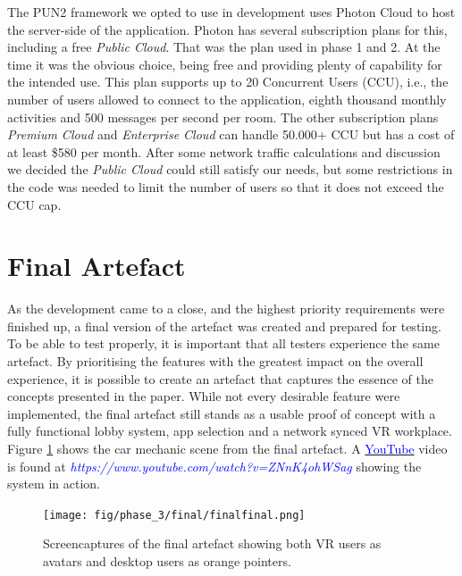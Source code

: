 The PUN2 framework we opted to use in development uses Photon Cloud to host the server-side of the application. Photon has several subscription plans for this, including a free \textit{Public Cloud}. That was the plan used in phase 1 and 2. At the time it was the obvious choice, being free and providing plenty of capability for the intended use. This plan supports up to 20 Concurrent Users (CCU), i.e., the number of users allowed to connect to the application, eighth thousand monthly activities and 500 messages per second per room. The other subscription plans \textit{Premium Cloud} and \textit{Enterprise Cloud} can handle 50.000+ CCU but has a cost of at least \$580 per month. After some network traffic calculations and discussion we decided the \textit{Public Cloud} could still satisfy our needs, but some restrictions in the code was needed to limit the number of users so that it does not exceed the CCU cap. 





\section{Final Artefact}
As the development came to a close, and the highest priority requirements were finished up, a final version of the artefact was created and prepared for testing. To be able to test properly, it is important that all testers experience the same artefact. By prioritising the features with the greatest impact on the overall experience, it is possible to create an artefact that captures the essence of the concepts presented in the paper. While not every desirable feature were implemented, the final artefact still stands as a usable proof of concept with a fully functional lobby system, app selection and a network synced VR workplace. Figure \ref{fig:finalArtefact} shows the car mechanic scene from the final artefact. A \href{https://www.youtube.com/watch?v=ZNnK4ohWSag}{\textcolor{blue}{YouTube}} video is found at \textcolor{blue}{\textit{https://www.youtube.com/watch?v=ZNnK4ohWSag}} showing the system in action.


\begin{figure}[]
  \centering
  \captionsetup{width=1\linewidth}
    \texttt{[image: fig/phase\_3/final/finalfinal.png]}
  \caption{Screencaptures of the final artefact showing both VR users as avatars and desktop users as orange pointers.}
  \label{fig:finalArtefact}
\end{figure}



